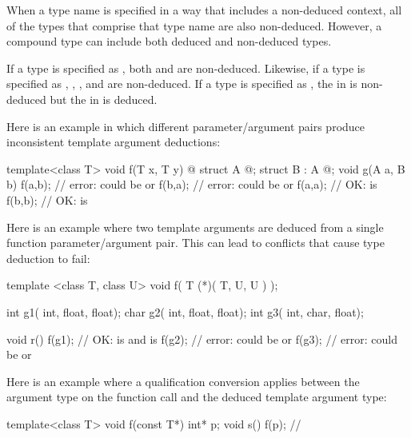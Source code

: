 \pnum
When a type name is specified in a way that includes a non-deduced
context, all of the types that comprise that type name are also
non-deduced.
However, a compound type can include both deduced and non-deduced types.
\begin{example}
If a type is specified as
,
both
and
are non-deduced.
Likewise, if a type is specified as
,
,
,
and
are non-deduced.
If a type is specified as
,
the
in
is non-deduced but
the
in
is deduced.
\end{example}

\pnum
\begin{example}
Here is an example in which different parameter/argument pairs produce
inconsistent template argument deductions:

\begin{codeblock}
template<class T> void f(T x, T y) { @\commentellip@ }
struct A { @\commentellip@ };
struct B : A { @\commentellip@ };
void g(A a, B b) {
  f(a,b);           // error:  could be  or 
  f(b,a);           // error:  could be  or 
  f(a,a);           // OK:  is 
  f(b,b);           // OK:  is 
}
\end{codeblock}

Here is an example where two template arguments are deduced from a
single function parameter/argument pair.
This can lead to conflicts
that cause type deduction to fail:

\begin{codeblock}
template <class T, class U> void f(  T (*)( T, U, U )  );

int g1( int, float, float);
char g2( int, float, float);
int g3( int, char, float);

void r() {
  f(g1);            // OK:  is  and  is 
  f(g2);            // error:  could be  or 
  f(g3);            // error:  could be  or 
}
\end{codeblock}

Here is an example where a qualification conversion applies between the
argument type on the function call and the deduced template argument type:

\begin{codeblock}
template<class T> void f(const T*) { }
int* p;
void s() {
  f(p);             // 
}
\end{codeblock}


\end{example}
